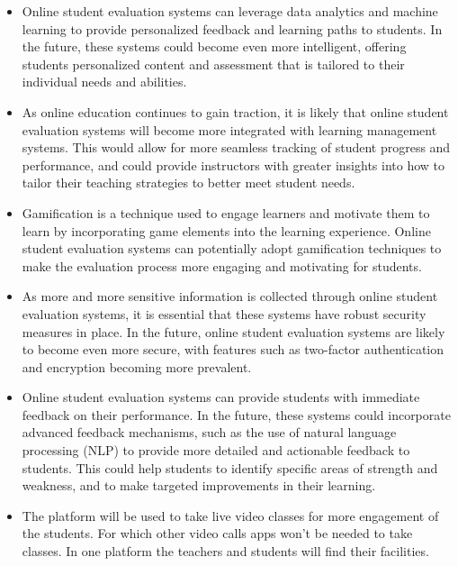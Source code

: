 \begin{itemize}
    \item	Online student evaluation systems can leverage data analytics and machine learning to provide personalized feedback and learning paths to students. In the future, these systems could become even more intelligent, offering students personalized content and assessment that is tailored to their individual needs and abilities.

    \item	As online education continues to gain traction, it is likely that online student evaluation systems will become more integrated with learning management systems. This would allow for more seamless tracking of student progress and performance, and could provide instructors with greater insights into how to tailor their teaching strategies to better meet student needs.

    \item	Gamification is a technique used to engage learners and motivate them to learn by incorporating game elements into the learning experience. Online student evaluation systems can potentially adopt gamification techniques to make the evaluation process more engaging and motivating for students.

    \item	As more and more sensitive information is collected through online student evaluation systems, it is essential that these systems have robust security measures in place. In the future, online student evaluation systems are likely to become even more secure, with features such as two-factor authentication and encryption becoming more prevalent.

    \item	Online student evaluation systems can provide students with immediate feedback on their performance. In the future, these systems could incorporate advanced feedback mechanisms, such as the use of natural language processing (NLP) to provide more detailed and actionable feedback to students. This could help students to identify specific areas of strength and weakness, and to make targeted improvements in their learning.

    \item	The platform will be used to take live video classes for more engagement of the students. For which other video calls apps won’t be needed to take classes. In one platform the teachers and students will find their facilities.
\end{itemize}